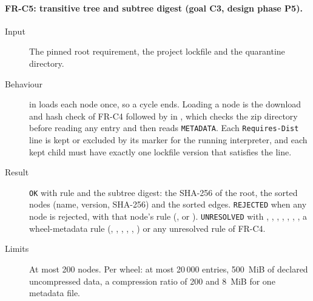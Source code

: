 \paragraph{FR-C5: transitive tree and subtree digest (goal C3, design phase P5).}
\begin{sloppypar}
\begin{description}
    \item[Input] The pinned root requirement, the project lockfile and the quarantine directory.
    \item[Behaviour]  in  loads each node once, so a cycle ends. Loading a node is the download and hash check of FR-C4 followed by  in , which checks the zip directory before reading any entry and then reads \texttt{METADATA}. Each \texttt{Requires-Dist} line is kept or excluded by its marker for the running interpreter, and each kept child must have exactly one lockfile version that satisfies the line.
    \item[Result] \texttt{OK} with rule  and the subtree digest: the SHA-256 of the root, the sorted nodes (name, version, SHA-256) and the sorted edges. \texttt{REJECTED} when any node is rejected, with that node's rule (,  or ). \texttt{UNRESOLVED} with , , , , , , , a wheel-metadata rule (, , , , , ) or any unresolved rule of FR-C4.
    \item[Limits] At most 200 nodes. Per wheel: at most 20\,000 entries, 500~MiB of declared uncompressed data, a compression ratio of 200 and 8~MiB for one metadata file.
\end{description}
\end{sloppypar}

